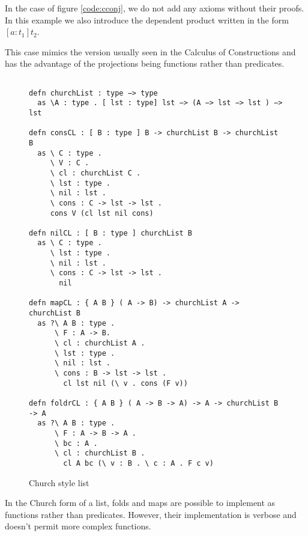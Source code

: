 In the case of figure \ref{code:cconj}, we do not add any axioms without their proofs.   
In this example we also introduce the dependent product written in the form $[ a : t_1 ] t_2$.

This case mimics the version usually seen in the Calculus of Constructions and has the advantage of
the projections being functions rather than predicates.


\begin{figure}[H]
\begin{lstlisting}

defn churchList : type −> type
  as \A : type . [ lst : type] lst −> (A −> lst −> lst ) −> lst

defn consCL : [ B : type ] B -> churchList B -> churchList B
  as \ C : type .
     \ V : C .
     \ cl : churchList C .
     \ lst : type .
     \ nil : lst .
     \ cons : C -> lst -> lst .
     cons V (cl lst nil cons)

defn nilCL : [ B : type ] churchList B
  as \ C : type .
     \ lst : type .
     \ nil : lst .
     \ cons : C -> lst -> lst .
       nil

defn mapCL : { A B } ( A -> B) -> churchList A -> churchList B
  as ?\ A B : type .
      \ F : A -> B.
      \ cl : churchList A .
      \ lst : type .
      \ nil : lst .
      \ cons : B -> lst -> lst .
        cl lst nil (\ v . cons (F v))

defn foldrCL : { A B } ( A -> B -> A) -> A -> churchList B -> A 
  as ?\ A B : type . 
      \ F : A -> B -> A .
      \ bc : A .
      \ cl : churchList B .
        cl A bc (\ v : B . \ c : A . F c v)

\end{lstlisting}
\caption{Church style list}
\label{code:clist}
\end{figure}

In the Church form of a list, folds and maps are possible to implement as functions
rather than predicates. However, their implementation is verbose and doesn't permit
more complex functions.


